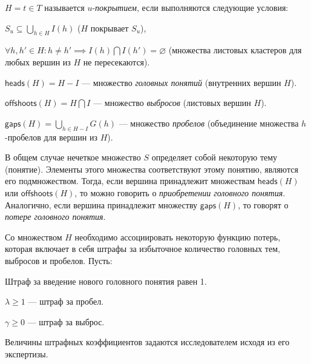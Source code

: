 \documentclass[12pt]{article}
\renewcommand{\emptyset}{\varnothing}
\newenvironment{itemize*}%
{\begin{itemize}%
	\setlength{\itemsep}{0pt}%
	\setlength{\parskip}{0pt}}%
{\end{itemize}}
\newenvironment{enumerate*}%
{\begin{enumerate}%
	\setlength{\itemsep}{0pt}%
	\setlength{\parskip}{0pt}}%
{\end{enumerate}}
\renewcommand{\cup}{\bigcup}
\renewcommand{\cap}{\bigcap}
\begin{document}
\begin{itemize*}
	\item $H={t\in T}$ называется $u$-\textit{покрытием}, если выполняются следующие условия:
	\begin{enumerate*}
		\item $S_u\subseteq \cup_{h\in H}I(h)$ ($H$ покрывает $S_u$),
		\item $\forall h, h' \in H: h\neq h' \implies I(h)\cap I(h') = \emptyset$ (множества листовых кластеров для любых вершин из $H$ не пересекаются).
	\end{enumerate*}
	\item $\textsf{heads}(H)=H-I$ --- множество \textit{головных понятий} (внутренних вершин $H$).
	\item $\textsf{offshoots}(H) = H\cap I$ --- множество \textit{выбросов} (листовых вершин $H$).
	\item $\textsf{gaps}(H) = \cup_{h\in H-I}G(h) $  --- множество \textit{пробелов} (объединение множества $h$-пробелов для вершин из $H$).
\end{itemize*}

В общем случае нечеткое множество $S$ определяет собой некоторую тему (понятие). Элементы этого множества соответствуют этому понятию, являются его подмножеством. Тогда, если вершина принадлежит множествам $\textsf{heads}(H)$ или $\textsf{offshoots}(H)$, то можно говорить о \textit{приобретении головного понятия}. Аналогично, если вершина принадлежит множеству $\textsf{gaps}(H)$, то говорят о \textit{потере головного понятия}.

Со множеством $H$ необходимо ассоциировать некоторую функцию потерь, которая включает в себя штрафы за избыточное количество головных тем, выбросов и пробелов. Пусть:

\begin{itemize*}
	\item Штраф за введение нового головного понятия равен 1.
	\item $\lambda\geq1$ --- штраф за пробел.
	\item $\gamma\geq0$ --- штраф за выброс.
\end{itemize*}
Величины штрафных коэффициентов задаются исследователем исходя из его экспертизы. 
\end{document}
